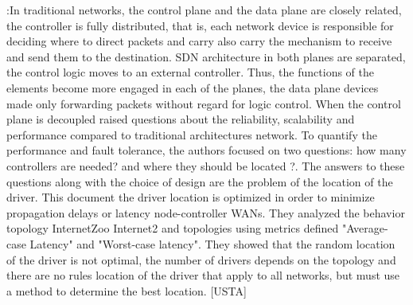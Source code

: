 \documentclass[a4paper,10pt]{article}
\begin{document}
\cite{HeSh12}:In traditional networks, the control plane and the data plane are closely related, the controller is fully distributed, that is, each network device is responsible for deciding where to direct packets and carry also carry the mechanism to receive and send them to the destination. SDN architecture in both planes are separated, the control logic moves to an external controller. Thus, the functions of the elements become more engaged in each of the planes, the data plane devices made only forwarding packets without regard for logic control.
When the control plane is decoupled raised questions about the reliability, scalability and performance compared to traditional architectures network. To quantify the performance and fault tolerance, the authors focused on two questions: how many controllers are needed? and where they should be located ?. The answers to these questions along with the choice of design are the problem of the location of the driver.
This document the driver location is optimized in order to minimize propagation delays or latency node-controller WANs. They analyzed the behavior topology InternetZoo Internet2 and topologies using metrics defined "Average-case Latency" and "Worst-case latency". They showed that the random location of the driver is not optimal, the number of drivers depends on the topology and there are no rules location of the driver that apply to all networks, but must use a method to determine the best location. [USTA]


\end{document}

